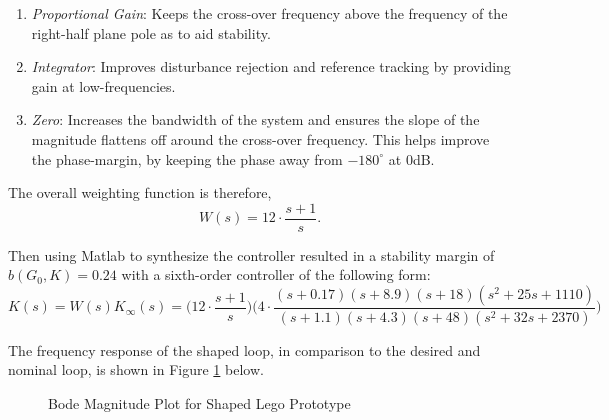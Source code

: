 \begin{enumerate}
\item{\textit{Proportional Gain}: Keeps the cross-over frequency above the frequency of the right-half plane pole as to aid stability.}
\item{\textit{Integrator}: Improves disturbance rejection and reference tracking by providing gain at low-frequencies.}
\item{\textit{Zero}: Increases the bandwidth of the system and ensures the slope of the magnitude flattens off around the cross-over frequency. This helps improve the phase-margin, by keeping the phase away from $-180^{\circ}$ at 0dB.}
\end{enumerate}

The overall weighting function is therefore,
\begin{equation*}
W(s) = 12 \cdot \frac{s + 1}{s}.
\end{equation*}

Then using Matlab to synthesize the controller resulted in a stability margin of $b(G_0,K) = 0.24$ with a sixth-order controller of the following form:
\begin{equation*}
K(s) = W(s) K_{\infty}(s) = \Big( 12 \cdot \frac{s+1}{s} \Big) \Big(4 \cdot \frac{(s+0.17)(s+8.9)(s+18)(s^2+25s+1110)}{(s+1.1)(s+4.3)(s+48)(s^2+32s+2370)} \Big)
\end{equation*}

The frequency response of the shaped loop, in comparison to the desired and nominal loop, is shown in Figure \ref{fig:bodeLegoShaped} below.

\begin{figure}[H]
	\centering
	\caption{Bode Magnitude Plot for Shaped Lego Prototype}
	\label{fig:bodeLegoShaped}
\end{figure}

